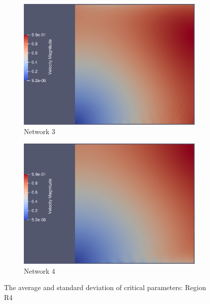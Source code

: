 \begin{figure}
\begin{subfigure}[b]{0.475\textwidth}
        \includegraphics[width=\textwidth]{./img/75.eps}
        \caption[]%
        {{\small Network 3}}
        \label{fig:mean and std of net34}
    \end{subfigure}
    \hfill
    \begin{subfigure}[b]{0.475\textwidth}
        \centering
        \includegraphics[width=\textwidth]{./img/100.eps}
        \caption[]%
        {{\small Network 4}}
        \label{fig:mean and std of net44}
    \end{subfigure}
    \caption[ The average and standard deviation of critical parameters ]
    {\small The average and standard deviation of critical parameters: Region R4}
    \label{fig:mean and std of nets}
\end{figure}
